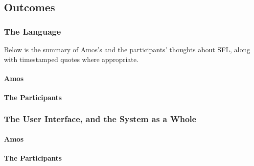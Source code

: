 \subsection{Outcomes}

\subsubsection{The Language}
Below is the summary of Amos's and the participants' thoughts about \ac{SFL}, along with timestamped quotes where appropriate.
\paragraph{Amos}


\paragraph{The Participants}

\subsubsection{The User Interface, and the System as a Whole}

\paragraph{Amos}

\paragraph{The Participants}





